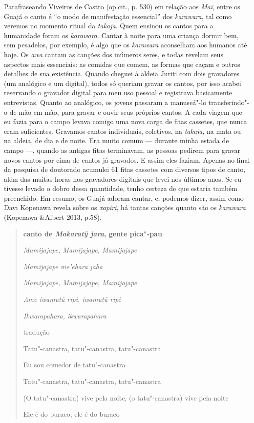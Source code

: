 Parafraseando Viveiros de Castro (op.cit., p. 530) em relação aos
\emph{Maï}, entre os Guajá o canto é ``o modo de manifestação essencial''
dos \emph{karawara}, tal como veremos no momento ritual da
\emph{takaja}. Quem ensinou os cantos para a humanidade foram os
\emph{karawara}. Cantar à noite para uma criança dormir bem, sem
pesadelos, por exemplo, é algo que os \emph{karawara} aconselham aos
humanos até hoje. Os \emph{awa} cantam as canções dos inúmeros seres, e
todas revelam seus aspectos mais essenciais: as comidas que comem, as
formas que caçam e outros detalhes de sua existência. Quando cheguei à
aldeia Juriti com dois gravadores (um analógico e um digital), todos só
queriam gravar os cantos, por isso acabei reservando o gravador digital
para meu uso pessoal e registrava basicamente entrevistas. Quanto ao
analógico, os jovens passaram a manuseá"-lo transferindo"-o de mão em mão,
para gravar e ouvir seus próprios cantos. A cada viagem que eu fazia
para o campo levava comigo uma nova carga de fitas cassetes, que nunca
eram suficientes. Gravamos cantos individuais, coletivos, na
\emph{takaja}, na mata ou na aldeia, de dia e de noite. Era muito comum
--- durante minha estada de campo ---, quando as antigas fitas terminavam,
as pessoas pedirem para gravar novos cantos por cima de cantos já
gravados. E assim eles faziam. Apenas no final da pesquisa de doutorado
acumulei 61 fitas cassetes com diversos tipos de canto, além das muitas
horas nos gravadores digitais que levei nos últimos anos. Se eu tivesse
levado o dobro dessa quantidade, tenho certeza de que estaria também
preenchido. Em resumo, os Guajá adoram cantar, e, podemos dizer, assim
como Davi Kopenawa revela sobre os \emph{xapiri}, há tantas canções
quanto são os \emph{karawara} (Kopenawa \&Albert 2013, p.58).

\begin{quote}
\textbf{canto de \emph{Makaratỹ jara}, gente pica"-pau}

\emph{Mamijajape, Mamijajape, Mamijajape}

\emph{Mamijajape me'ehara jaha}

\emph{Mamijajape, Mamijajape, Mamijajape}

\emph{Ame iwamutũ ripi, iwamutũ ripi }

\emph{Ikwarapahara, ikwarapahara }

tradução

Tatu"-canastra, tatu"-canastra, tatu"-canastra

Eu sou comedor de tatu"-canastra

Tatu"-canastra, tatu"-canastra, tatu"-canastra

(O tatu"-canastra) vive pela noite, (o tatu"-canastra) vive pela noite

Ele é do buraco, ele é do buraco
\end{quote}

